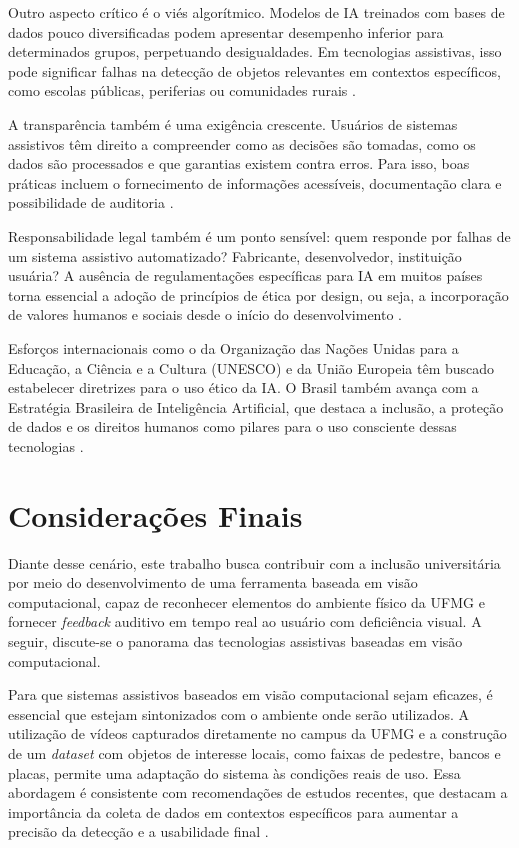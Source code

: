 Outro aspecto crítico é o viés algorítmico. Modelos de IA treinados com bases de dados pouco diversificadas podem apresentar desempenho inferior para determinados grupos, perpetuando desigualdades. Em tecnologias assistivas, isso pode significar falhas na detecção de objetos relevantes em contextos específicos, como escolas públicas, periferias ou comunidades rurais \cite{Buolamwini2018}.

A transparência também é uma exigência crescente. Usuários de sistemas assistivos têm direito a compreender como as decisões são tomadas, como os dados são processados e que garantias existem contra erros. Para isso, boas práticas incluem o fornecimento de informações acessíveis, documentação clara e possibilidade de auditoria \cite{Morley2020}.

Responsabilidade legal também é um ponto sensível: quem responde por falhas de um sistema assistivo automatizado? Fabricante, desenvolvedor, instituição usuária? A ausência de regulamentações específicas para IA em muitos países torna essencial a adoção de princípios de ética por design, ou seja, a incorporação de valores humanos e sociais desde o início do desenvolvimento \cite{Dignum2019}.

Esforços internacionais como o da Organização das Nações Unidas para a Educação, a Ciência e a Cultura (UNESCO) e da União Europeia têm buscado estabelecer diretrizes para o uso ético da IA. O Brasil também avança com a Estratégia Brasileira de Inteligência Artificial, que destaca a inclusão, a proteção de dados e os direitos humanos como pilares para o uso consciente dessas tecnologias \cite{MCTI2021}.

\section{\textbf{Considerações Finais}}

Diante desse cenário, este trabalho busca contribuir com a inclusão universitária por meio do desenvolvimento de uma ferramenta baseada em visão computacional, capaz de reconhecer elementos do ambiente físico da UFMG e fornecer \textit{feedback} auditivo em tempo real ao usuário com deficiência visual. A seguir, discute-se o panorama das tecnologias assistivas baseadas em visão computacional. 

Para que sistemas assistivos baseados em visão computacional sejam eficazes, é essencial que estejam sintonizados com o ambiente onde serão utilizados. A utilização de vídeos capturados diretamente no campus da UFMG e a construção de um \textit{dataset} com objetos de interesse locais, como faixas de pedestre, bancos e placas, permite uma adaptação do sistema às condições reais de uso. Essa abordagem é consistente com recomendações de estudos recentes, que destacam a importância da coleta de dados em contextos específicos para aumentar a precisão da detecção e a usabilidade final \cite{Borges2023}. 